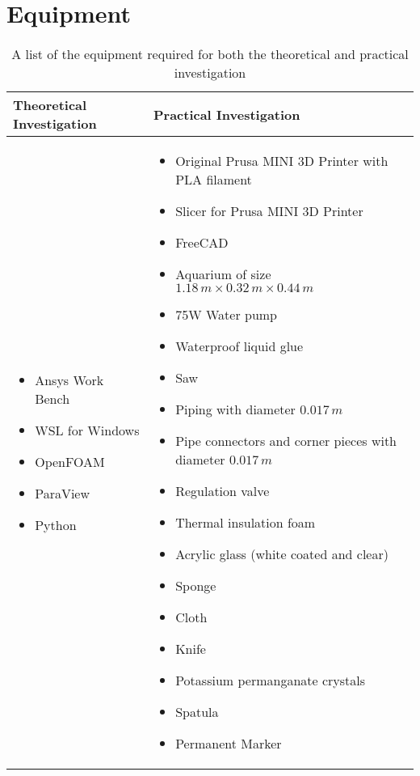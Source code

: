 \section{Equipment}
\begin{table}[H]
	\centering
	\renewcommand{\arraystretch}{1.3}
	\begin{tabularx}{\textwidth}{|X|X|}
		\hline
		\textbf{Theoretical Investigation} & \textbf{Practical Investigation} \\
		\hline
		\begin{itemize}[leftmargin=1.5em, itemsep=2pt, topsep=0pt, label=--]
			\item Ansys Work Bench \parencite{noauthor_ansys_nodate}
			\item WSL for Windows \parencite{noauthor_windows_nodate}
			\item OpenFOAM \parencite{noauthor_openfoam_2024}
			\item ParaView \parencite{noauthor_paraview_nodate}
			\item Python \parencite{noauthor_python_2025}
		\end{itemize} 
		&
		\begin{itemize}[leftmargin=1.5em, itemsep=2pt, topsep=0pt, label=--]
			\item Original Prusa MINI 3D Printer with PLA filament \parencite{noauthor_prusa_nodate}
			\item Slicer for Prusa MINI 3D Printer \parencite{noauthor_prusaslicer_nodate}
			\item FreeCAD \parencite{noauthor_freecad_nodate}
			\item Aquarium of size $ 1.18\,m \times 0.32\,m \times 0.44\,m $
			\item 75W Water pump \parencite{noauthor_lnicez_nodate}
			\item Waterproof liquid glue
			\item Saw
			\item Piping with diameter $0.017\,m$ 
			\item Pipe connectors and corner pieces with diameter $0.017\,m$ 
			\item Regulation valve
			\item Thermal insulation foam
			\item Acrylic glass (white coated and clear)
			\item Sponge
			\item Cloth
			\item Knife
			\item Potassium permanganate crystals
			\item Spatula
			\item Permanent Marker
			
		\end{itemize} \\
		\hline
	\end{tabularx}
	\caption{A list of the equipment required for both the theoretical and practical investigation}
	\label{tab:equipmentList}
\end{table}
